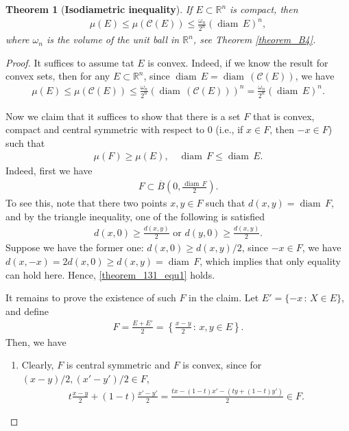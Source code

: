 \documentclass[11pt]{book}
\newtheorem{theorem}{Theorem}[chapter]
\theoremstyle{definition}
\numberwithin{equation}{chapter}
\def\diam{{\operatorname{diam}\,}}
\begin{document}
\begin{theorem}[{\bf Isodiametric inequality}]\label{theorem_131}
If $E \subset \mathbb{R}^n$ is compact, then
\begin{align*}
    \mu(E) \leq \mu(\mathcal{C}(E)) \leq \frac{\omega_n}{2^n} (\diam E)^n,
\end{align*}
where $\omega_n$ is the volume of the unit ball in $\mathbb{R}^n$, see Theorem \ref{theorem_B4}.
\end{theorem}
\begin{proof}
It suffices to assume tat $E$ is convex. Indeed, if we know the result for convex sets, then for any $E \subset \mathbb{R}^n$, since $\diam E = \diam (\mathcal{C}(E))$, we have
\begin{align*}
    \mu(E) \leq \mu(\mathcal{C}(E)) \leq \frac{\omega_n}{2^n} (\diam (\mathcal{C}(E)))^n = \frac{\omega_n}{2^n} (\diam E)^n.
\end{align*}

Now we claim that it suffices to show that there is a set $F$ that is convex, compact and central symmetric with respect to $0$ (i.e., if $x \in F$, then $-x \in F$) such that 
\begin{align*}
    \mu(F) \geq \mu(E), \quad \diam F \leq \diam E.
\end{align*}
Indeed, first we have
\begin{align}\label{theorem_131_equ1}
    F \subset \overline{B}\left(0, \frac{\diam F}{2}\right).
\end{align}
To see this, note that there two points $x,y \in F$ such that $d(x,y) = \diam F$, and by the triangle inequality, one of the following is satisfied
\begin{align*}
    d(x,0) \geq \frac{d(x,y)}{2} \,\,\text{or}\,\, d(y,0) \geq \frac{d(x,y)}{2}.
\end{align*}
Suppose we have the former one: $d(x,0) \geq d(x,y)/2$, since $-x \in F$, we have $d(x,-x) = 2d(x,0) \geq d(x,y) = \diam F$, which implies that only equality can hold here. Hence, \eqref{theorem_131_equ1} holds.

It remains to prove the existence of such $F$ in the claim. Let $E' = \{-x \,:\, X \in E\}$, and define
\begin{align*}
    F = \frac{E + E'}{2} = \left\{\frac{x - y}{2} \,:\, x, y \in E\right\}.
\end{align*}
Then, we have
\begin{enumerate}[label=(\alph*)]
    \item Clearly, $F$ is central symmetric and $F$ is convex, since for $(x-y)/2, (x'-y')/2 \in F$,
    \begin{align*}
        t \frac{x - y}{2} + (1 - t) \frac{x' - y'}{2} = \frac{tx - (1-t)x' - (ty + (1-t)y')}{2} \in F.
    \end{align*}
    

\end{enumerate}
\end{proof}
\end{document}
